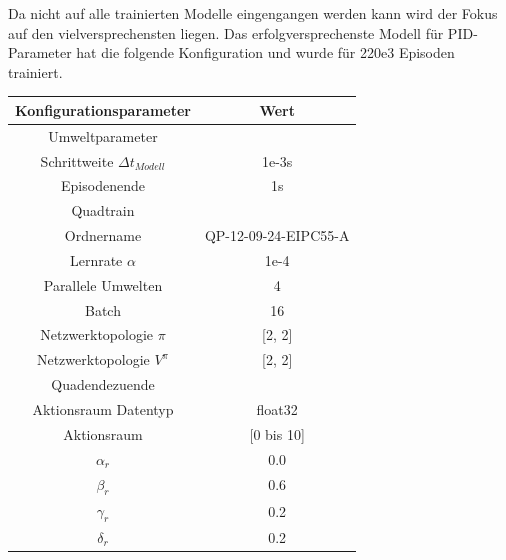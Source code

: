 \begin{center}
\end{center}
\vspace*{0.5cm}
Da nicht auf alle trainierten Modelle eingengangen werden kann wird der Fokus auf den vielversprechensten liegen. Das erfolgversprechenste Modell für PID-Parameter hat die folgende Konfiguration und wurde für 220e3 Episoden trainiert. 
\begin{center}
\begin{tabular}[h]{|c|c|}
\hline 
Konfigurationsparameter & Wert \\
\hline 
Umweltparameter & \\
Schrittweite $\Delta t_{Modell}$ & 1e-3s \\
Episodenende & 1s\\
\hline
Quadtrain & \\
Ordnername & QP-12-09-24-EIPC55-A\\
Lernrate $\alpha$ & 1e-4\\
Parallele Umwelten & 4\\
Batch & 16\\
Netzwerktopologie $\pi$ & [2, 2]\\
Netzwerktopologie $V^{\pi}$ & [2, 2]\\
\hline
Quadendezuende & \\
Aktionsraum Datentyp & float32\\
Aktionsraum & [0 bis 10]\\
$\alpha_r$ & 0.0\\ 
$\beta_r$ & 0.6\\
$\gamma_r$ & 0.2\\
$\delta_r$ & 0.2\\
\hline
\end{tabular}
\end{center}
